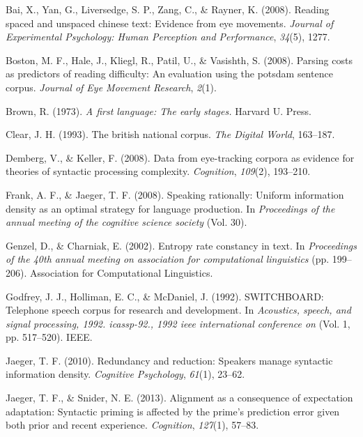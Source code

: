 \documentclass[10pt, letterpaper]{article}
\begin{document}
\hypertarget{ref-bai2008}{}
Bai, X., Yan, G., Liversedge, S. P., Zang, C., \& Rayner, K. (2008).
Reading spaced and unspaced chinese text: Evidence from eye movements.
\emph{Journal of Experimental Psychology: Human Perception and
Performance}, \emph{34}(5), 1277.

\hypertarget{ref-boston2008}{}
Boston, M. F., Hale, J., Kliegl, R., Patil, U., \& Vasishth, S. (2008).
Parsing costs as predictors of reading difficulty: An evaluation using
the potsdam sentence corpus. \emph{Journal of Eye Movement Research},
\emph{2}(1).

\hypertarget{ref-brown1973}{}
Brown, R. (1973). \emph{A first language: The early stages.} Harvard U.
Press.

\hypertarget{ref-clear1993british}{}
Clear, J. H. (1993). The british national corpus. \emph{The Digital
World}, 163--187.

\hypertarget{ref-demberg2008}{}
Demberg, V., \& Keller, F. (2008). Data from eye-tracking corpora as
evidence for theories of syntactic processing complexity.
\emph{Cognition}, \emph{109}(2), 193--210.

\hypertarget{ref-frank2008speaking}{}
Frank, A. F., \& Jaeger, T. F. (2008). Speaking rationally: Uniform
information density as an optimal strategy for language production. In
\emph{Proceedings of the annual meeting of the cognitive science
society} (Vol. 30).

\hypertarget{ref-genzel2002}{}
Genzel, D., \& Charniak, E. (2002). Entropy rate constancy in text. In
\emph{Proceedings of the 40th annual meeting on association for
computational linguistics} (pp. 199--206). Association for Computational
Linguistics.

\hypertarget{ref-godfrey1992}{}
Godfrey, J. J., Holliman, E. C., \& McDaniel, J. (1992). SWITCHBOARD:
Telephone speech corpus for research and development. In
\emph{Acoustics, speech, and signal processing, 1992. icassp-92., 1992
ieee international conference on} (Vol. 1, pp. 517--520). IEEE.

\hypertarget{ref-jaeger2010}{}
Jaeger, T. F. (2010). Redundancy and reduction: Speakers manage
syntactic information density. \emph{Cognitive Psychology},
\emph{61}(1), 23--62.

\hypertarget{ref-jaeger2013}{}
Jaeger, T. F., \& Snider, N. E. (2013). Alignment as a consequence of
expectation adaptation: Syntactic priming is affected by the prime's
prediction error given both prior and recent experience.
\emph{Cognition}, \emph{127}(1), 57--83.
\end{document}
